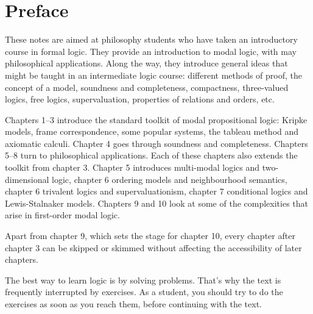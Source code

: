 \chapter*{Preface}\label{ch:preface}

These notes are aimed at philosophy students who have taken an introductory
course in formal logic. They provide an introduction to modal logic, with may
philosophical applications. Along the way, they introduce general ideas that
might be taught in an intermediate logic course: different methods of proof, the
concept of a model, soundness and completeness, compactness, three-valued
logics, free logics, supervaluation, properties of relations and orders, etc.

Chapters 1--3 introduce the standard toolkit of modal propositional logic:
Kripke models, frame correspondence, some popular systems, the tableau method
and axiomatic calculi. Chapter 4 goes through soundness and completeness.
Chapters 5--8 turn to philosophical applications. Each of these chapters also
extends the toolkit from chapter 3. Chapter 5 introduces multi-modal logics and
two-dimensional logic, chapter 6 ordering models and neighbourhood semantics,
chapter 6 trivalent logics and supervaluationism, chapter 7 conditional
logics and Lewis-Stalnaker models. Chapters 9 and 10 look at some of the
complexities that arise in first-order modal logic.

Apart from chapter 9, which sets the stage for chapter 10, every chapter after
chapter 3 can be skipped or skimmed without affecting the accessibility of later
chapters.

The best way to learn logic is by solving problems. That's why the text is
frequently interrupted by exercises. As a student, you should try to do the
exercises as soon as you reach them, before continuing with the text.


